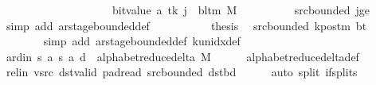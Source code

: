 \begin{isabellebody}
\ \ \ \ \ \ \ \ \ \ \ \ \ \ \ \ \ \ \ {\isacharplus}{\kern0pt}\ bit{\isacharunderscore}{\kern0pt}value\ {\isacharparenleft}{\kern0pt}{\isacharquery}{\kern0pt}a\ tk{\isacharparenright}{\kern0pt}{\isacharparenright}{\kern0pt}{\isacharparenright}{\kern0pt}{\isacharparenright}{\kern0pt}\ j\ {\isacharequal}{\kern0pt}\ bl{\isacharunderscore}{\kern0pt}tm\ M{\isachardoublequoteclose}\isanewline
\ \ \ \ \ \ \ \ \isamarkupfalse%
\ src{\isacharunderscore}{\kern0pt}bounded\ jge\ \isamarkupfalse%
\ {\isacharparenleft}{\kern0pt}simp\ add{\isacharcolon}{\kern0pt}\ ar{\isacharunderscore}{\kern0pt}stage{\isacharunderscore}{\kern0pt}bounded{\isacharunderscore}{\kern0pt}def{\isacharparenright}{\kern0pt}\isanewline
\ \ \ \ \isamarkupfalse%
\isanewline
\ \ \ \ \isamarkupfalse%
\ {\isacharquery}{\kern0pt}thesis\ \isamarkupfalse%
\ src{\isacharunderscore}{\kern0pt}bounded\ kpos{\isacharunderscore}{\kern0pt}tm\ bt\isanewline
\ \ \ \ \ \ \isamarkupfalse%
\ {\isacharparenleft}{\kern0pt}simp\ add{\isacharcolon}{\kern0pt}\ ar{\isacharunderscore}{\kern0pt}stage{\isacharunderscore}{\kern0pt}bounded{\isacharunderscore}{\kern0pt}def\ k{\isacharunderscore}{\kern0pt}unidx{\isacharunderscore}{\kern0pt}def{\isacharparenright}{\kern0pt}\isanewline
\ \ \isamarkupfalse%
\isanewline
\ \ \isamarkupfalse%
\ ard{\isacharunderscore}{\kern0pt}in{\isacharcolon}{\kern0pt}\ {\isachardoublequoteopen}{\isacharparenleft}{\kern0pt}{\isacharquery}{\kern0pt}s{\isacharcomma}{\kern0pt}\ {\isacharquery}{\kern0pt}a{\isacharcomma}{\kern0pt}\ {\isacharquery}{\kern0pt}s{\isacharprime}{\kern0pt}{\isacharcomma}{\kern0pt}\ {\isacharquery}{\kern0pt}a{\isacharcomma}{\kern0pt}\ {\isacharquery}{\kern0pt}d{\isacharparenright}{\kern0pt}\ {\isasymin}\ alphabet{\isacharunderscore}{\kern0pt}reduce{\isacharunderscore}{\kern0pt}delta\ M{\isachardoublequoteclose}\isanewline
\ \ \ \ \isamarkupfalse%
\ alphabet{\isacharunderscore}{\kern0pt}reduce{\isacharunderscore}{\kern0pt}delta{\isacharunderscore}{\kern0pt}def\isanewline
\ \ \ \ \isamarkupfalse%
\ rel{\isacharunderscore}{\kern0pt}in\ vsrc\ dst{\isacharunderscore}{\kern0pt}valid\ pad{\isacharunderscore}{\kern0pt}read\ src{\isacharunderscore}{\kern0pt}bounded\ dst{\isacharunderscore}{\kern0pt}bd\isanewline
\ \ \ \ \isamarkupfalse%
\ {\isacharparenleft}{\kern0pt}auto\ split{\isacharcolon}{\kern0pt}\ if{\isacharunderscore}{\kern0pt}splits{\isacharparenright}{\kern0pt}\isanewline

\end{isabellebody}
